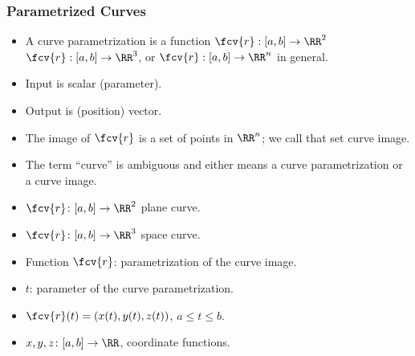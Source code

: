 \begin{frame}
\frametitle{Parametrized Curves}
\begin{itemize}
\item \alert<5>{A curve parametrization is a function} $\fcv{r}: [a,b] \to \RR^2$ $\fcv{r}:[a,b]\to \RR^{3}$, or $\fcv{r}:[a,b]\to\RR^{n}  $ in general.
\item<2-> Input is scalar (parameter).
\item<3-> Output is (position) vector.
\item<4-> The image of $\fcv{r}$ is a \alert<5>{ set of points} in $\RR^{n}$; we call that set \alert<5>{curve image}.
\item<5-> The term ``curve'' is ambiguous and either means a \alert<5>{ curve parametrization or a curve image}.
\item<6-> $\fcv{r} \colon [a,b] \to \RR^2$ plane curve.
\item<7-> $\fcv{r} \colon [a,b] \to \RR^3$ space curve.
\item<8-> Function $\fcv{r}$: parametrization of the curve image.
\item<9-> $t$: parameter of the curve parametrization.
\item<10-> $\fcv{r}(t) = ( x(t), y(t), z(t))$, $a \leq t \leq b$.
\item<11-> $x,y,z \colon [a,b] \to \RR$, coordinate functions.
\end{itemize}
\end{frame}
